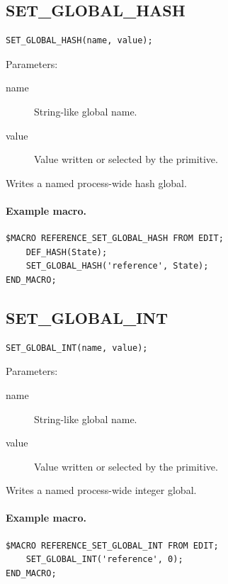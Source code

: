 \documentclass[a4paper,10pt,twoside,openany]{book}
\newenvironment{mrmacextension}{\begin{changebar}}{\end{changebar}}
\begin{document}
\begin{mrmacextension}
\label{prim:procedure-set-global-hash}
\subsection*{SET\_GLOBAL\_HASH}
\begin{verbatim}
SET_GLOBAL_HASH(name, value);
\end{verbatim}
Parameters:
\begin{description}
\item[name] String-like global name.
\item[value] Value written or selected by the primitive.
\end{description}

Writes a named process-wide hash global.

\paragraph{Example macro.}
\begin{verbatim}
$MACRO REFERENCE_SET_GLOBAL_HASH FROM EDIT;
    DEF_HASH(State);
    SET_GLOBAL_HASH('reference', State);
END_MACRO;
\end{verbatim}
\end{mrmacextension}

\begin{mrmacextension}
\label{prim:procedure-set-global-int}
\subsection*{SET\_GLOBAL\_INT}
\begin{verbatim}
SET_GLOBAL_INT(name, value);
\end{verbatim}
Parameters:
\begin{description}
\item[name] String-like global name.
\item[value] Value written or selected by the primitive.
\end{description}

Writes a named process-wide integer global.

\paragraph{Example macro.}
\begin{verbatim}
$MACRO REFERENCE_SET_GLOBAL_INT FROM EDIT;
    SET_GLOBAL_INT('reference', 0);
END_MACRO;
\end{verbatim}
\end{mrmacextension}
\end{document}
